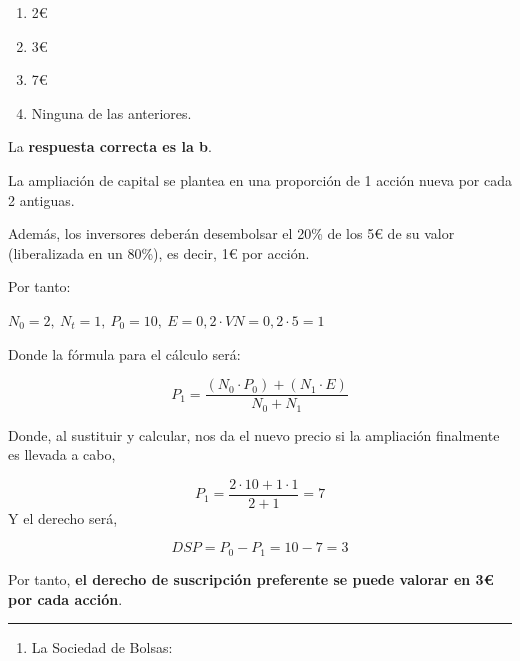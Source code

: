 \documentclass[
  letterpaper,
  DIV=11,
  numbers=noendperiod]{scrreprt}
\providecommand{\tightlist}{%
  \setlength{\itemsep}{0pt}\setlength{\parskip}{0pt}}\usepackage{longtable,booktabs,array}
\begin{document}
\begin{enumerate}
\def\labelenumi{\alph{enumi}.}
\item
  2€
\item
  3€
\item
  7€
\item
  Ninguna de las anteriores.
\end{enumerate}

\begin{tcolorbox}[enhanced jigsaw, left=2mm, opacityback=0, colback=white, breakable, arc=.35mm, bottomrule=.15mm, rightrule=.15mm, toprule=.15mm, leftrule=.75mm, colframe=quarto-callout-tip-color-frame]
\begin{minipage}[t]{5.5mm}
\textcolor{quarto-callout-tip-color}{\faLightbulb}
\end{minipage}%
\begin{minipage}[t]{\textwidth - 5.5mm}

La \textbf{respuesta correcta es la b}.

La ampliación de capital se plantea en una proporción de 1 acción nueva
por cada 2 antiguas.

Además, los inversores deberán desembolsar el 20\% de los 5€ de su valor
(liberalizada en un 80\%), es decir, 1€ por acción.

Por tanto:

\(N_0= 2,\ N_t=1,\ P_0=10,\ E=0,2\cdot VN=0,2\cdot 5=1\)

Donde la fórmula para el cálculo será:

\[P_1=\frac{\left(N_0\cdot P_0\right)+\left(N_1\cdot E\right)}{N_0+N_1}\]

Donde, al sustituir y calcular, nos da el nuevo precio si la ampliación
finalmente es llevada a cabo,

\[P_1=\frac{2\cdot10+1\cdot1}{2+1}=7\] Y el derecho será,

\[DSP=P_0-P_1=10-7=3\]

Por tanto, \textbf{el derecho de suscripción preferente se puede valorar
en 3€ por cada acción}.

\end{minipage}%
\end{tcolorbox}

\begin{center}\rule{0.5\linewidth}{0.5pt}\end{center}

\begin{enumerate}
\def\labelenumi{\arabic{enumi}.}
\setcounter{enumi}{67}
\tightlist
\item
  La Sociedad de Bolsas:
\end{enumerate}
\end{document}
